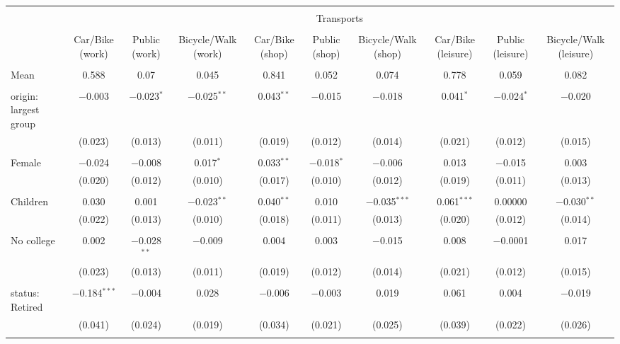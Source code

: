 
\begin{tabular}{@{\extracolsep{5pt}}lccccccccc} 
\\[-1.8ex]\hline 
\hline \\[-1.8ex] 
 & \multicolumn{9}{c}{Transports} \\ 
\cline{2-10} 
\\[-1.8ex] & Car/Bike (work) & Public (work) & Bicycle/Walk (work) & Car/Bike (shop) & Public (shop) & Bicycle/Walk (shop) & Car/Bike (leisure) & Public (leisure) & Bicycle/Walk (leisure) \\ 
\hline \\[-1.8ex] 
 Mean & 0.588 & 0.07 & 0.045 & 0.841 & 0.052 & 0.074 & 0.778 & 0.059 & 0.082  \\ \hline \\[-1.8ex] origin: largest group & $-$0.003 & $-$0.023$^{*}$ & $-$0.025$^{**}$ & 0.043$^{**}$ & $-$0.015 & $-$0.018 & 0.041$^{*}$ & $-$0.024$^{*}$ & $-$0.020 \\ 
  & (0.023) & (0.013) & (0.011) & (0.019) & (0.012) & (0.014) & (0.021) & (0.012) & (0.015) \\ 
  & & & & & & & & & \\ 
 Female & $-$0.024 & $-$0.008 & 0.017$^{*}$ & 0.033$^{**}$ & $-$0.018$^{*}$ & $-$0.006 & 0.013 & $-$0.015 & 0.003 \\ 
  & (0.020) & (0.012) & (0.010) & (0.017) & (0.010) & (0.012) & (0.019) & (0.011) & (0.013) \\ 
  & & & & & & & & & \\ 
 Children & 0.030 & 0.001 & $-$0.023$^{**}$ & 0.040$^{**}$ & 0.010 & $-$0.035$^{***}$ & 0.061$^{***}$ & 0.00000 & $-$0.030$^{**}$ \\ 
  & (0.022) & (0.013) & (0.010) & (0.018) & (0.011) & (0.013) & (0.020) & (0.012) & (0.014) \\ 
  & & & & & & & & & \\ 
 No college & 0.002 & $-$0.028$^{**}$ & $-$0.009 & 0.004 & 0.003 & $-$0.015 & 0.008 & $-$0.0001 & 0.017 \\ 
  & (0.023) & (0.013) & (0.011) & (0.019) & (0.012) & (0.014) & (0.021) & (0.012) & (0.015) \\ 
  & & & & & & & & & \\ 
 status: Retired & $-$0.184$^{***}$ & $-$0.004 & 0.028 & $-$0.006 & $-$0.003 & 0.019 & 0.061 & 0.004 & $-$0.019 \\ 
  & (0.041) & (0.024) & (0.019) & (0.034) & (0.021) & (0.025) & (0.039) & (0.022) & (0.026) \\ 
  & & & & & & & & & \\ 

\end{tabular}
